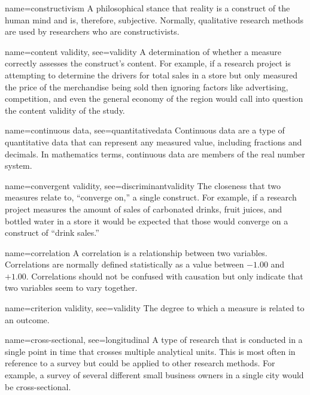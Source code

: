 {name={constructivism}}
{%
	A philosophical stance that reality is a construct of the human mind and is, therefore, subjective. Normally, qualitative research methods are used by researchers who are constructivists.
}

{name={content validity},
	see={validity}}
{%
	A determination of whether a measure correctly assesses the construct's content. For example, if a research project is attempting to determine the drivers for total sales in a store but only measured the price of the merchandise being sold then ignoring factors like advertising, competition, and even the general economy of the region would call into question the content validity of the study.
}

{name={continuous data},
	see={quantitativedata}}
{%
	Continuous data are a type of quantitative data that can represent any measured value, including fractions and decimals. In mathematics terms, continuous data are members of the real number system. 
}


{name={convergent validity},
	see={discriminantvalidity}}
{%
	The closeness that two measures relate to, ``converge on,'' a single construct. For example, if a research project measures the amount of sales of carbonated drinks, fruit juices, and bottled water in a store it would be expected that those would converge on a construct of ``drink sales.''
}

{name={correlation}}
{%
	A correlation is a relationship between two variables. Correlations are normally defined statistically as a value between $ -1.00 $ and $ +1.00 $. Correlations should not be confused with causation but only indicate that two variables seem to vary together. 
}

{name={criterion validity},
	see={validity}}
{%
	The degree to which a measure is related to an outcome.  
}

{name={cross-sectional},
	see={longitudinal}}
{%
	A type of research that is conducted in a single point in time that crosses multiple analytical units. This is most often in reference to a survey but could be applied to other research methods. For example, a survey of several different small business owners in a single city would be cross-sectional. 
}


